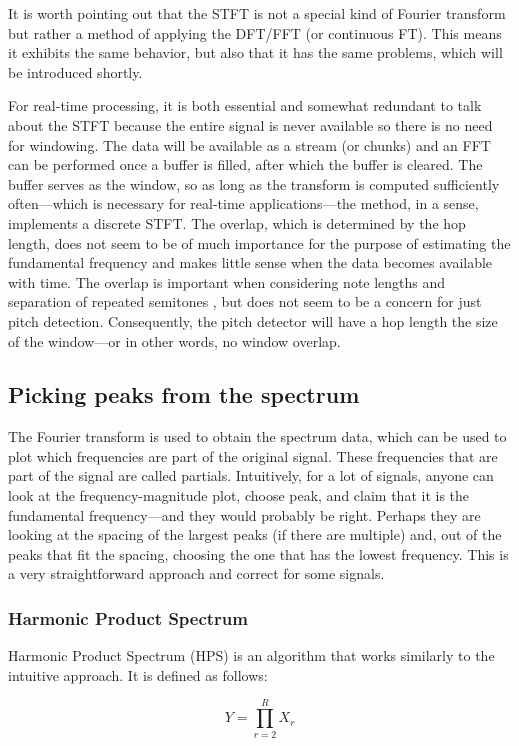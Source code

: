 It is worth pointing out that the STFT is not a special kind of Fourier transform but rather a method of applying the DFT/FFT (or continuous FT). This means it exhibits the same behavior, but also that it has the same problems, which will be introduced shortly. 

For real-time processing, it is both essential and somewhat redundant to talk about the STFT because the entire signal is never available so there is no need for windowing. The data will be available as a stream (or chunks) and an FFT can be performed once a buffer is filled, after which the buffer is cleared. The buffer serves as the window, so as long as the transform is computed sufficiently often—which is necessary for real-time applications—the method, in a sense, implements a discrete STFT. The overlap, which is determined by the hop length, does not seem to be of much importance for the purpose of estimating the fundamental frequency and makes little sense when the data becomes available with time. The overlap is important when considering note lengths and separation of repeated semitones \cite{Evans2012}, but does not seem to be a concern for just pitch detection. Consequently, the pitch detector will have a hop length the size of the window—or in other words, no window overlap.

\subsection{Picking peaks from the spectrum}
The Fourier transform is used to obtain the spectrum data, which can be used to plot which frequencies are part of the original signal. These frequencies that are part of the signal are called partials. Intuitively, for a lot of signals, anyone can look at the frequency-magnitude plot, choose peak, and claim that it is the fundamental frequency—and they would probably be right. Perhaps they are looking at the spacing of the largest peaks (if there are multiple) and, out of the peaks that fit the spacing, choosing the one that has the lowest frequency. This is a very straightforward approach and correct for some signals. 

\subsubsection{Harmonic Product Spectrum}
Harmonic Product Spectrum (HPS) is an algorithm that works similarly to the intuitive approach. It is defined as follows:

$$Y = \prod_{r=2}^R X_r$$

